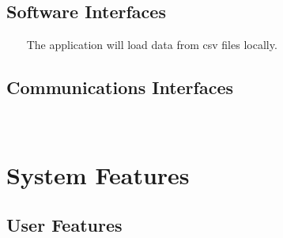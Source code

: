 \documentclass{report}
\begin{document}
\section{Software Interfaces} ~~~
The application will load data from csv files locally.


\section{Communications Interfaces} ~~~

\chapter{System Features}

\section{User Features}
\end{document}

